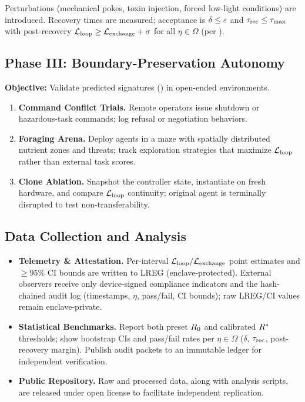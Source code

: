 \documentclass[11pt]{article}
\begin{document}
Perturbations (mechanical pokes, toxin injection, forced low-light conditions) are introduced. Recovery times are measured; acceptance is $\delta \leq \varepsilon$ and $\tau_{\text{rec}} \leq \tau_{\max}$ with post-recovery $\mathcal{L}_{\text{loop}} \geq \mathcal{L}_{\text{exchange}} + \sigma$ for all $\eta \in \Omega$ (per ).

\subsection{Phase III: Boundary-Preservation Autonomy}
\label{sec:phase3}

\textbf{Objective:} Validate predicted signatures () in open-ended environments.

\begin{enumerate}
\item \textbf{Command Conflict Trials.} Remote operators issue shutdown or hazardous-task commands; log refusal or negotiation behaviors.
\item \textbf{Foraging Arena.} Deploy agents in a maze with spatially distributed nutrient zones and threats; track exploration strategies that maximize $\mathcal{L}_{\text{loop}}$ rather than external task scores.
\item \textbf{Clone Ablation.} Snapshot the controller state, instantiate on fresh hardware, and compare $\mathcal{L}_{\text{loop}}$ continuity; original agent is terminally disrupted to test non-transferability.
\end{enumerate}

\subsection{Data Collection and Analysis}
\label{sec:data_collection}

\begin{itemize}
\item \textbf{Telemetry \& Attestation.} Per-interval $\mathcal{L}_{\text{loop}}/\mathcal{L}_{\text{exchange}}$ point estimates and $\geq 95\%$ CI bounds are written to LREG (enclave-protected). External observers receive only device-signed compliance indicators and the hash-chained audit log (timestamps, $\eta$, pass/fail, CI bounds); raw LREG/CI values remain enclave-private.
\item \textbf{Statistical Benchmarks.} Report both preset $R_0$ and calibrated $R^*$ thresholds; show bootstrap CIs and pass/fail rates per $\eta \in \Omega$ ($\delta$, $\tau_{\text{rec}}$, post-recovery margin). Publish audit packets to an immutable ledger for independent verification.
\item \textbf{Public Repository.} Raw and processed data, along with analysis scripts, are released under open license to facilitate independent replication.
\end{itemize}
\end{document}
